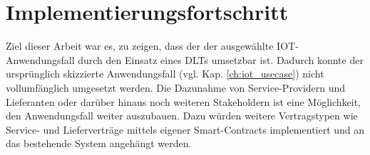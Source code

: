 \section{Implementierungsfortschritt}
\label{sec:results:progress}
Ziel dieser Arbeit war es, zu zeigen, dass der der ausgewählte \ac{IOT}-Anwendungsfall durch den Einsatz eines \acp{DLT} umsetzbar ist. Dadurch konnte der ursprünglich skizzierte Anwendungsfall (vgl. Kap. \ref{ch:iot_usecase}) nicht vollumfänglich umgesetzt werden. Die Dazunahme von Service-Providern und Lieferanten oder darüber hinaus noch weiteren Stakeholdern ist eine Möglichkeit, den Anwendungsfall weiter auszubauen. Dazu würden weitere Vertragstypen wie Service- und Lieferverträge mittels eigener Smart-Contracts implementiert und an das bestehende System angehängt werden.
